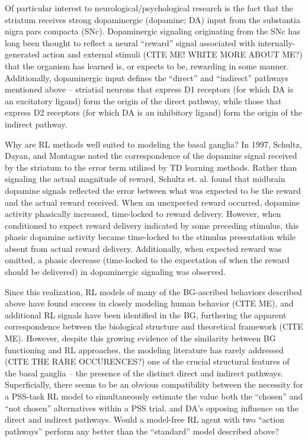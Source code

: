 \documentclass[10pt,letterpaper]{article}
\begin{document}
Of particular interest to neurological/psychological research is the fact that the striatum receives strong dopaminergic (dopamine; DA) input from the substantia nigra pars compacta (SNc). Dopaminergic signaling originating from the SNc has long been thought to reflect a neural “reward” signal associated with internally-generated action and external stimuli (CITE ME! WRITE MORE ABOUT ME?) that the organism has learned is, or expects to be, rewarding in some manner. Additionally, dopaminergic input defines the “direct” and “indirect” pathways mentioned above – striatial neurons that express D1 receptors (for which DA is an excitatory ligand) form the origin of the direct pathway, while those that express D2 receptors (for which DA is an inhibitory ligand) form the origin of the indirect pathway.

Why are RL methods well suited to modeling the basal ganglia? In 1997, Schultz, Dayan, and Montague noted the correspondence of the dopamine signal received by the striatum to the error term utilized by TD learning methods. Rather than signaling the actual magnitude of reward, Schultz et. al. found that midbrain dopamine signals reflected the error between what was expected to be the reward and the actual reward received. When an unexpected reward occurred, dopamine activity phasically increased, time-locked to reward delivery. However, when conditioned to expect reward delivery indicated by some preceding stimulus, this phasic dopamine activity became time-locked to the stimulus presentation while absent from actual reward delivery. Additionally, when expected reward was omitted, a phasic decrease (time-locked to the expectation of when the reward should be delivered) in dopaminergic signaling was observed. 

Since this realization, RL models of many of the BG-ascribed behaviors described above have found success in closely modeling human behavior (CITE ME), and additional RL signals have been identified in the BG, furthering the apparent correspondence between the biological structure and theoretical framework (CITE ME). However, despite this growing evidence of the similarity between BG functioning and RL approaches, the modeling literature has rarely addressed (CITE THE RARE OCCURENCES?) one of the crucial structural features of the basal ganglia – the presence of the distinct direct and indirect pathways. Superficially, there seems to be an obvious compatibility between the necessity for a PSS-task RL model to simultaneously estimate the value both the “chosen” and “not chosen” alternatives within a PSS trial, and DA’s opposing influence on the direct and indirect pathways. Would a model-free RL agent with two “action pathways” perform any better than the “standard” model described above?
\end{document}
